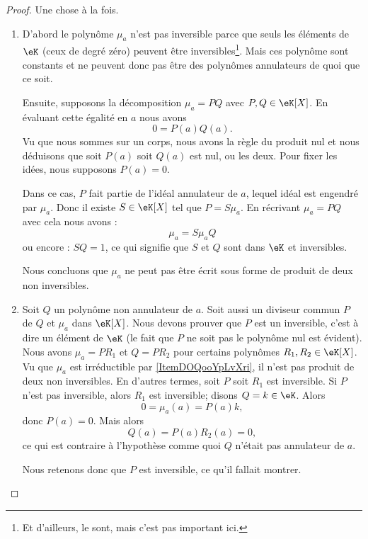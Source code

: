 \begin{proof}
    Une chose à la fois.
    \begin{enumerate}
        \item
            D'abord le polynôme \( \mu_a\) n'est pas inversible parce que seuls les éléments de \( \eK\) (ceux de degré zéro) peuvent être inversibles\footnote{Et d'ailleurs, le sont, mais c'est pas important ici.}. Mais ces polynôme sont constants et ne peuvent donc pas être des polynômes annulateurs de quoi que ce soit.

            Ensuite, supposons la décomposition \( \mu_a=PQ\) avec \( P,Q\in \eK[X]\). En évaluant cette égalité en \( a\) nous avons
            \begin{equation}
                0=P(a)Q(a).
            \end{equation}
            Vu que nous sommes sur un corps, nous avons la règle du produit nul et nous déduisons que soit \( P(a)\) soit \( Q(a)\) est nul, ou les deux. Pour fixer les idées, nous supposons \( P(a)=0\).

            Dans ce cas, \( P\) fait partie de l'idéal annulateur de \( a\), lequel idéal est engendré par \( \mu_a\). Donc il existe \( S\in \eK[X]\) tel que \( P=S\mu_a\). En récrivant \( \mu_a=PQ\) avec cela nous avons :
            \begin{equation}
                \mu_a=S\mu_aQ
            \end{equation}
            ou encore : \( SQ=1\), ce qui signifie que \( S\) et \( Q\) sont dans \( \eK\) et inversibles.

            Nous concluons que \( \mu_a\) ne peut pas être écrit sous forme de produit de deux non inversibles.
        \item
            Soit \( Q\) un polynôme non annulateur de \( a\). Soit aussi un diviseur commun \( P\) de \( Q\) et \( \mu_a\) dans \( \eK[X]\). Nous devons prouver que \( P\) est un inversible, c'est à dire un élément de \( \eK\) (le fait que \( P\) ne soit pas le polynôme nul est évident).
            Nous avons \( \mu_a=PR_1\) et \( Q=PR_2\) pour certains polynômes \( R_1,R_2\in \eK[X]\). Vu que \( \mu_a\) est irréductible par \ref{ItemDOQooYpLvXri}, il n'est pas produit de deux non inversibles. En d'autres termes, soit \( P\) soit \( R_1\) est inversible. Si \( P \) n'est pas inversible, alors \( R_1\) est inversible; disons \( Q=k\in \eK\). Alors 
            \begin{equation}
                0=\mu_a(a)=P(a)k,
            \end{equation}
            donc \( P(a)=0\). Mais alors
            \begin{equation}
                Q(a)=P(a)R_2(a)=0,
            \end{equation}
            ce qui est contraire à l'hypothèse comme quoi \( Q\) n'était pas annulateur de \( a\).

            Nous retenons donc que \( P\) est inversible, ce qu'il fallait montrer.
    \end{enumerate}
\end{proof}


